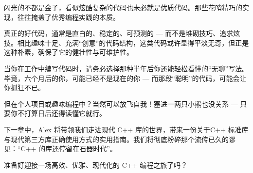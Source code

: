 闪光的不都是金子，看似炫酷复杂的代码也未必就是优质代码。那些花哨精巧的实现，往往掩盖了优秀编程实践的本质。

真正的好代码，通常是直白的、稳定的、可预测的 --- 而不是堆砌技巧、追求炫技。相比趣味十足、充满“创意”的代码结构，这类代码或许显得平淡无奇，但正是这种朴素，确保了它的健壮性与可维护性。

当你在工作中编写代码时，请务必选择那种半年后你还能轻松看懂的“无聊”写法。毕竟，六个月后的你，可能已经不是现在的你 --- 而那段“聪明”的代码，可能会让你抓狂不已。

但在个人项目或趣味编程中？当然可以放飞自我！塞进一两只小熊也没关系 --- 只要你不打算日后还得读懂它就行。

下一章中，Alex 将带领我们走进现代 C++ 库的世界，带来一份关于C++ 标准库与现代第三方库正确使用方式的实用指南。我们将彻底粉碎那个流传已久的谬见：“C++ 的库还停留在石器时代”。

准备好迎接一场高效、优雅、现代化的 C++ 编程之旅了吗？